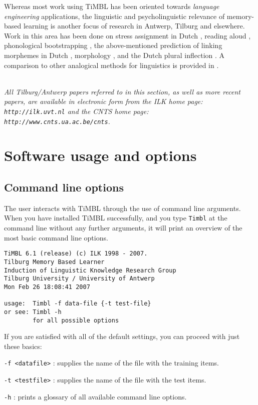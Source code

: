 \documentclass{report}
\begin{document}
Whereas most work using TiMBL has been oriented towards {\em language
  engineering}\/ applications, the linguistic and psycholinguistic
relevance of memory-based learning is another focus of research in
Antwerp, Tilburg and elsewhere. Work in this area has been done on
stress assignment in Dutch \cite{Daelemans+94,Gillis+00}, reading
aloud \cite{VandenBosch+00b}, phonological bootstrapping
\cite{Durieux+00}, the above-mentioned prediction of linking morphemes
in Dutch \cite{Krott+01}, morphology \cite{Eddington00,Eddington03},
and the Dutch plural inflection \cite{Keuleers+07}. A comparison to
other analogical methods for linguistics is provided in
\cite{Daelemans+97f}.

\ \\

{\it All Tilburg/Antwerp papers referred to in this section, as well
as more recent papers, are available in electronic form from the {\sc
ILK} home page: {\tt http://ilk.uvt.nl} and the {\sc CNTS} home page: \\
{\tt http://www.cnts.ua.ac.be/cnts}.}

\chapter{Software usage and options}
\label{reference}

\section{Command line options}
\label{commandline}

The user interacts with TiMBL through the use of command line arguments.
When you have installed TiMBL successfully, and you type {\tt Timbl} at the
command line without any further arguments, it will print an overview
of the most basic command line options. 

{\footnotesize
\begin{verbatim}
TiMBL 6.1 (release) (c) ILK 1998 - 2007.
Tilburg Memory Based Learner
Induction of Linguistic Knowledge Research Group
Tilburg University / University of Antwerp
Mon Feb 26 18:08:41 2007

usage:  Timbl -f data-file {-t test-file}
or see: Timbl -h
        for all possible options
\end{verbatim}
}

If you are satisfied with all of the default settings, you can proceed
with just these basics:

\begin{description}

\item {\tt -f <datafile>} : supplies the name of the file with the
training items.
\item {\tt -t <testfile>} : supplies the name of the file with the
test items.
\item {\tt -h} : prints a glossary of all available command line 
options.

\end{description}
\end{document}
